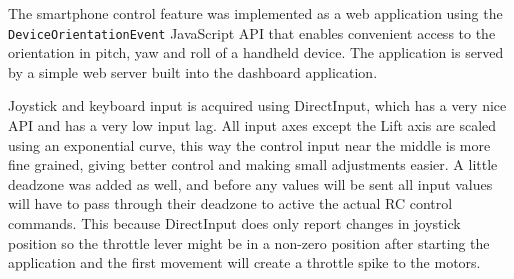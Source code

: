 \documentclass[final]{article}
\begin{document}
The smartphone control feature was implemented as a web application using the \texttt{DeviceOrientationEvent} JavaScript API that enables convenient access to the orientation in pitch, yaw and roll of a handheld device.
The application is served by a simple web server built into the dashboard application.

Joystick and keyboard input is acquired using DirectInput, which has a very nice API and has a very low input lag.
All input axes except the Lift axis are scaled using an exponential curve, this way the control input near the middle is more fine grained, giving better control and making small adjustments easier.
A little deadzone was added as well, and before any values will be sent all input values will have to pass through their deadzone to active the actual RC control commands.
This because DirectInput does only report changes in joystick position so the throttle lever might be in a non-zero position after starting the application and the first movement will create a throttle spike to the motors.
\end{document}
